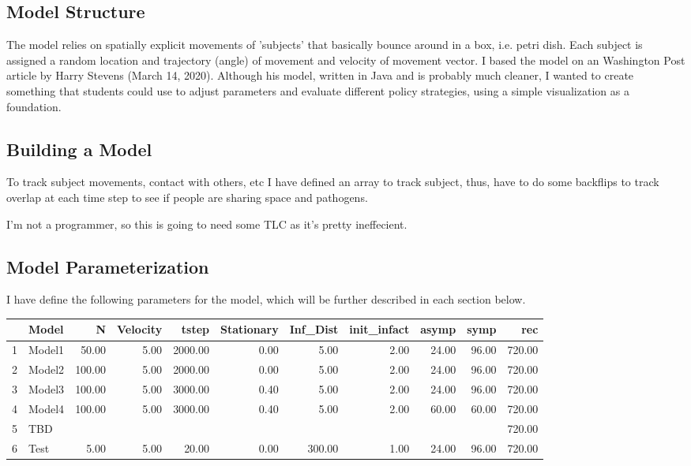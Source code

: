 \documentclass{article}\usepackage[]{graphicx}\usepackage[]{color}
\begin{document}
\subsection{Model Structure}

The model relies on spatially explicit movements of 'subjects' that basically bounce around in a box, i.e. petri dish. Each subject is assigned a random location and trajectory (angle) of movement and velocity of movement vector. I based the model on an Washington Post article by Harry Stevens (March 14, 2020). Although his model, written in Java and is probably much cleaner, I wanted to create something that students could use to adjust parameters and evaluate different policy strategies, using a simple visualization as a foundation. 


\subsection{Building a Model}

To track subject movements, contact with others, etc I have defined an array to track subject, thus, have to do some backflips to track overlap at each time step to see if people are sharing space and pathogens. 

I'm not a programmer, so this is going to need some TLC as it's pretty ineffecient. 

\subsection{Model Parameterization}



I have define the following parameters for the model, which will be further described in each section below.

\begin{table}[ht]
\centering
\begin{tabular}{rlrrrrrrrrr}
  \hline
 & Model & N & Velocity & tstep & Stationary & Inf\_Dist & init\_infact & asymp & symp & rec \\ 
  \hline
1 & Model1 & 50.00 & 5.00 & 2000.00 & 0.00 & 5.00 & 2.00 & 24.00 & 96.00 & 720.00 \\ 
  2 & Model2 & 100.00 & 5.00 & 2000.00 & 0.00 & 5.00 & 2.00 & 24.00 & 96.00 & 720.00 \\ 
  3 & Model3 & 100.00 & 5.00 & 3000.00 & 0.40 & 5.00 & 2.00 & 24.00 & 96.00 & 720.00 \\ 
  4 & Model4 & 100.00 & 5.00 & 3000.00 & 0.40 & 5.00 & 2.00 & 60.00 & 60.00 & 720.00 \\ 
  5 & TBD &  &  &  &  &  &  &  &  & 720.00 \\ 
  6 & Test & 5.00 & 5.00 & 20.00 & 0.00 & 300.00 & 1.00 & 24.00 & 96.00 & 720.00 \\ 
   \hline
\end{tabular}
\end{table}
\end{document}
